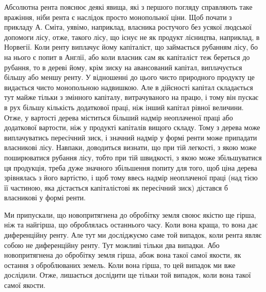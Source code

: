 Абсолютна рента пояснює деякі явища, які з першого погляду справляють
таке вражіння, ніби рента є наслідок просто монопольної ціни. Щоб почати
з прикладу А. Сміта, уявімо, наприклад, власника ростучого без усякої
людської допомоги лісу, отже, такого лісу, що існує не як продукт лісництва,
наприклад, в Норвегії. Коли ренту виплачує йому капіталіст, що займається
рубанням лісу, бо на нього є попит в Англії, або коли власник сам як капіталіст
теж береться до рубання, то в дереві йому, крім зиску на авансований
капітал, виплачується більшу або меншу ренту. У відношенні до цього чисто
природного продукту це видається чисто монопольною надвишкою. Але в дійсності
капітал складається тут майже тільки з змінного капіталу, витрачуваного
на працю, і тому він пускає в рух більшу кількість додаткової праці, ніж інший
капітал рівної величини. Отже, у вартості дерева міститься більший надмір
неоплаченої праці або додаткової вартости, ніж у продукті капіталів вищого
складу. Тому з дерева може виплачуватись пересічний зиск, і значний надмір у
формі ренти може припадати власникові лісу. Навпаки, доводиться визнати, що
при тій легкості, з якою може поширюватися рубання лісу, тобто при тій
швидкості, з якою може збільшуватися ця продукція, треба дуже значного збільшення
попиту для того, щоб ціна дерева зрівнялась з його вартістю, і щоб тому
ввесь надмір неоплаченої праці (над тією її частиною, яка дістається капіталістові
як пересічний зиск) дістався б власникові у формі ренти.

Ми припускали, що новопритягнена до обробітку земля своює якістю ще
гірша, ніж та найгірша, що оброблялась останнього часу. Коли вона краща, то
вона дає диференційну ренту. Але тут ми досліджуємо саме той випадок, коли
рента являє собою не диференційну ренту. Тут можливі тільки два випадки.
Або новопритягнена до обробітку земля гірша, абож вона такої самої якости,
як остання з оброблюваних земель. Коли вона гірша, то цей випадок ми вже
дослідили. Отже, лишається дослідити ще тільки той випадок, коли вона такої
самої якости.
